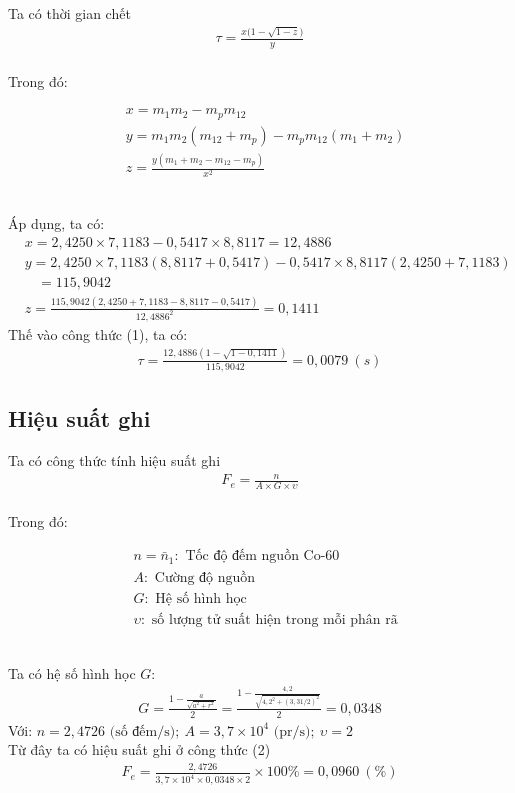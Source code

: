 \documentclass{article}
\begin{document}
Ta có thời gian chết
\begin{align}
	\tau = \frac{x\Big(1- \sqrt{1-z}\Big)}{y}
\end{align}
\\
Trong đó:
\begin{fleqn}[\parindent]
\begin{equation*}
\begin{split}
& x = m_1m_2-m_pm_{12}  \\
& y = m_1m_2(m_{12}+m_p)-m_pm_{12}(m_1+m_2) \\
& z = \frac{y(m_1+m_2-m_{12}-m_p)}{x^2} 
\end{split}
\end{equation*}
\end{fleqn}
\\
Áp dụng, ta có:
\begin{align*}
& x = 2,4250\times 7,1183 - 0,5417\times 8,8117 = 12,4886  \\
& y = 2,4250\times 7,1183(8,8117 + 0,5417)-0,5417\times 8,8117(2,4250 + 7,1183) \\
& \ \text{   }= 115,9042 \\
& z = \frac{115,9042(2,4250+7,1183-8,8117-0,5417)}{{12,4886}^2} = 0,1411 
\end{align*}
Thế vào công thức (1), ta có:
\begin{align*}
	\tau = \frac{12,4886(1-\sqrt{1-0,1411})}{115,9042} = 0,0079 \ (s)
\end{align*}

\subsection{Hiệu suất ghi}

Ta có công thức tính hiệu suất ghi
\begin{align}
	F_e = \frac{n}{A\times G \times \upsilon}
\end{align}
\\
Trong đó:
\begin{fleqn}[\parindent]
\begin{equation*}
\begin{split}
& n = \bar{n}_1: \text{ Tốc độ đếm nguồn Co-60}  \\
& A: \text{ Cường độ nguồn} \\
& G: \text{ Hệ số hình học} \\
& \upsilon : \text{ số lượng tử suất hiện trong mỗi phân rã} 
\end{split}
\end{equation*}
\end{fleqn}
\\
Ta có hệ số hình học $G$:
\begin{align*}
	G = \frac{1 - \frac{a}{\sqrt{a^2 + r^2}}}{2} = \frac{1 - \frac{4,2}{\sqrt{{4,2}^2 + (3,31/2)^2}}}{2} = 0,0348
\end{align*}
Với: $n=2,4726 \text{ (số đếm/s)};\ A = 3,7\times 10^4 \text{ (pr/s)};\ \upsilon = 2$
\\
Từ đây ta có hiệu suất ghi ở công thức (2)
\begin{align*}
	F_e = \frac{2,4726}{3,7\times 10^4 \times 0,0348 \times 2} \times 100\% = 0,0960 \ (\%)
\end{align*}
\end{document}
